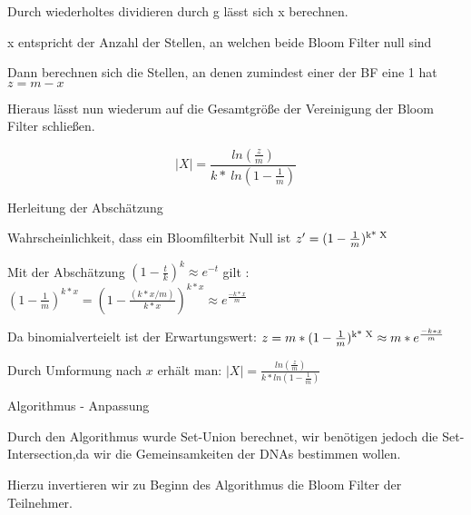 \documentclass{beamer}
\begin{document}
	\begin{frame}
		\begin{arrowlist}
			\item Durch wiederholtes dividieren durch g lässt sich x berechnen.
			\item x entspricht der Anzahl der Stellen, an welchen beide Bloom Filter null sind
			\item Dann berechnen sich die Stellen, an denen zumindest einer der BF eine 1 hat $z = m - x$
			\item Hieraus lässt nun wiederum auf die Gesamtgröße der Vereinigung der Bloom Filter schließen.
		\end{arrowlist}
		$$ |X| = \frac{ln( \frac{z}{m})}{k* \ ln(1- \frac{1}{m})}$$
	\end{frame}
	
	
	
	
	\begin{frame}{Herleitung der Abschätzung}
		
		\begin{arrowlist}
			\item Wahrscheinlichkeit, dass ein Bloomfilterbit Null ist $ z' = (1 -\frac{1}{m})\textsuperscript{k* X} $
			\newline
			\item Mit der Abschätzung $ (1 -\frac{t}{k})^{k} \approx e^{-t} $ gilt :
			\newline
			\newline
			$ (1-\frac{1}{m}) ^{k*x} = (1-\frac{(k*x/m)}{k*x})^{k*x} \approx e^{\frac{-k*x}{m}}$ 
			\newline
			\item Da binomialverteielt ist der Erwartungswert:
			$ z = m*(1 -\frac{1}{m})\textsuperscript{k* X}\approx m*e^{\frac{-k*x}{m}} $ 
			\newline
			\item Durch Umformung nach $ x $ erhält man:  $ |X| = \frac{ln( \frac{z}{m})}{k* ln(1- \frac{1}{m})}$
		\end{arrowlist}
		
		
	\end{frame}
	
	
	\begin{frame}{Algorithmus - Anpassung} 
		\begin{arrowlist}
			\item Durch den Algorithmus wurde Set-Union berechnet, wir benötigen jedoch die Set-Intersection,da wir die Gemeinsamkeiten der DNAs bestimmen wollen.
			\item Hierzu invertieren wir zu Beginn des Algorithmus die Bloom Filter der Teilnehmer.
		\end{arrowlist}
	\end{frame}
\end{document}
